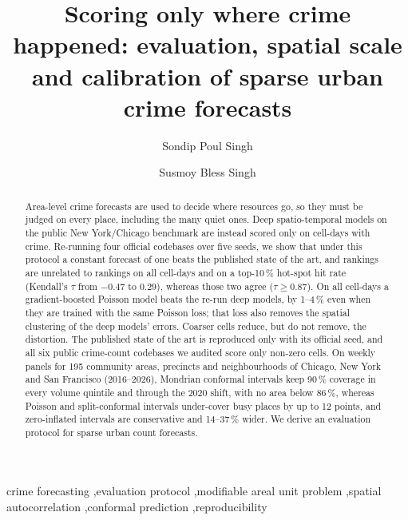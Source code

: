 \documentclass[preprint,12pt,authoryear]{elsarticle}
\newif\ifanonymous
\begin{document}
\begin{frontmatter}

\title{Scoring only where crime happened: evaluation, spatial scale and calibration of sparse urban crime forecasts}

\ifanonymous\else
\author[aff1]{Sondip Poul Singh}
\author[aff1]{Susmoy Bless Singh}
\fi

\begin{abstract}
Area-level crime forecasts are used to decide where resources go, so they must be judged on every place, including the many quiet ones. Deep spatio-temporal models on the public New York/Chicago benchmark are instead scored only on cell-days with crime. Re-running four official codebases over five seeds, we show that under this protocol a constant forecast of one beats the published state of the art, and rankings are unrelated to rankings on all cell-days and on a top-10\,\% hot-spot hit rate (Kendall's $\tau$ from $-0.47$ to $0.29$), whereas those two agree ($\tau\ge0.87$). On all cell-days a gradient-boosted Poisson model beats the re-run deep models, by 1--4\,\% even when they are trained with the same Poisson loss; that loss also removes the spatial clustering of the deep models' errors. Coarser cells reduce, but do not remove, the distortion. The published state of the art is reproduced only with its official seed, and all six public crime-count codebases we audited score only non-zero cells. On weekly panels for 195 community areas, precincts and neighbourhoods of Chicago, New York and San Francisco (2016--2026), Mondrian conformal intervals keep 90\,\% coverage in every volume quintile and through the 2020 shift, with no area below 86\,\%, whereas Poisson and split-conformal intervals under-cover busy places by up to 12 points, and zero-inflated intervals are conservative and 14--37\,\% wider. We derive an evaluation protocol for sparse urban count forecasts.
\end{abstract}

\begin{keyword}
crime forecasting \sep evaluation protocol \sep modifiable areal unit problem \sep spatial autocorrelation \sep conformal prediction \sep reproducibility
\end{keyword}

\end{frontmatter}
\end{document}
